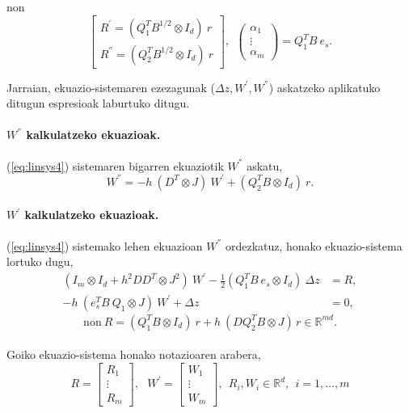 non 
\begin{equation*}
\begin{bmatrix}
 R^{'}=(Q_1^{T}B^{1/2} \otimes I_d) \ r \\
 R^{''}=(Q_2^{T}B^{1/2} \otimes I_d) \ r
\end{bmatrix}, \ \
\left(
\begin{matrix}
\alpha_1 \\
\vdots \\
\alpha_m
\end{matrix}
\right)=Q_1^TB \ e_s.
\end{equation*}

Jarraian, ekuazio-sistemaren ezezagunak ($\Delta z,W^{'},W^{''}$) askatzeko aplikatuko ditugun espresioak laburtuko ditugu.

\paragraph*{$W^{''}$ kalkulatzeko ekuazioak.}

(\ref{eq:linsys4}) sistemaren  bigarren ekuaziotik $W^{''}$ askatu,
\begin{equation}
\label{eq:W''}
W^{''}= -h \ (D^T \otimes J) \ W^{'}+(Q_2^T B \otimes I_d) \ r.
\end{equation}

\paragraph*{$W^{'}$ kalkulatzeko ekuazioak.}

(\ref{eq:linsys4}) sistemako lehen ekuazioan $W^{''}$ ordezkatuz, honako ekuazio-sistema lortuko dugu,
\begin{align*}
(I_m \otimes I_d+ h^2DD^T \otimes J^2) \ W^{'}- \frac{1}{2}(Q_1^T B \ e_s \otimes I_d)\ \Delta z&=R, \\
- h \ (e_s^T B \ Q_1 \otimes J) \ W^{'} + \Delta z &=0,
\end{align*}
\begin{equation}
\label{eq:R}
\text{non} \ R=(Q_1^T B \otimes I_d) \ r + h \  ( D Q_2^T B \otimes J)\,  r \in \mathbb{R}^{md}.
\end{equation}

\paragraph*{}Goiko ekuazio-sistema honako notazioaren arabera,  
\begin{equation*}
R=\begin{bmatrix}
R_1 \\
\vdots \\
R_m
\end{bmatrix}, \ \ \
W^{'}=\begin{bmatrix}
W_1 \\
\vdots \\
W_m
\end{bmatrix}, 
\ \ R_i,W_i \in \mathbb{R}^d, \ \ i=1,\dots,m  
\end{equation*}

